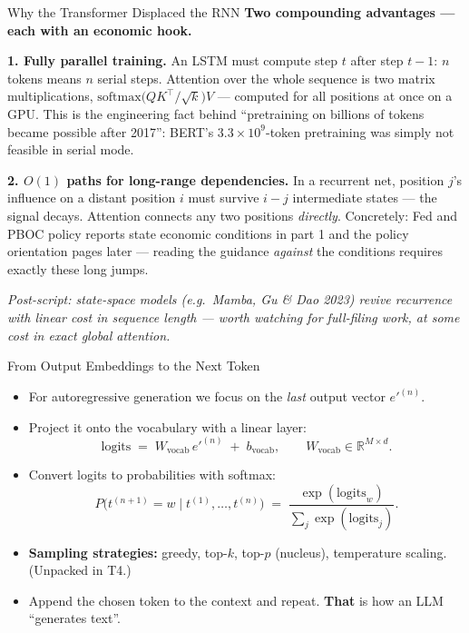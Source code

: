 \begin{frame}{Why the Transformer Displaced the RNN}
\textbf{Two compounding advantages --- each with an economic hook.}
\begin{conceptbox}
\textbf{1. Fully parallel training.} An LSTM must compute step $t$ after step $t-1$: $n$ tokens means $n$ serial steps. Attention over the whole sequence is two matrix multiplications, $\mathrm{softmax}\bigl(QK^{\top}/\sqrt{k}\bigr)V$ --- computed for all positions at once on a GPU. This is the engineering fact behind ``pretraining on billions of tokens became possible after 2017'': BERT's $3.3\times 10^9$-token pretraining was simply not feasible in serial mode.
\end{conceptbox}
\smallskip
\begin{conceptbox}
\textbf{2. $O(1)$ paths for long-range dependencies.} In a recurrent net, position $j$'s influence on a distant position $i$ must survive $i-j$ intermediate states --- the signal decays. Attention connects any two positions \emph{directly}. Concretely: Fed and PBOC policy reports state economic conditions in part 1 and the policy orientation pages later --- reading the guidance \emph{against} the conditions requires exactly these long jumps.
\end{conceptbox}
\smallskip
\textit{\footnotesize Post-script: state-space models (e.g.\ Mamba, Gu \& Dao 2023) revive recurrence with linear cost in sequence length --- worth watching for full-filing work, at some cost in exact global attention.}
\end{frame}

\begin{frame}{From Output Embeddings to the Next Token}
\begin{itemize}
\item For autoregressive generation we focus on the \emph{last} output vector $e'^{(n)}$.

\medskip
\item Project it onto the vocabulary with a linear layer:
\[
   \text{logits} \;=\; W_{\text{vocab}}\, e'^{(n)} \;+\; b_{\text{vocab}}, \qquad W_{\text{vocab}} \in \mathbb{R}^{M \times d}.
\]

\medskip
\item Convert logits to probabilities with softmax:
\[
   P\bigl(t^{(n+1)} = w \mid t^{(1)}, \ldots, t^{(n)}\bigr) \;=\; \frac{\exp(\text{logits}_{w})}{\sum_{j} \exp(\text{logits}_{j})}.
\]

\medskip
\item \textbf{Sampling strategies:} greedy, top-$k$, top-$p$ (nucleus), temperature scaling. (Unpacked in T4.)

\medskip
\item Append the chosen token to the context and repeat. \textbf{That} is how an LLM ``generates text''.
\end{itemize}
\end{frame}

